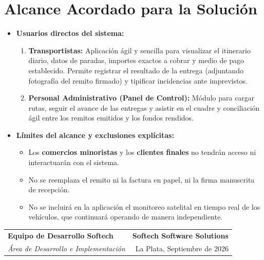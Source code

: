 \documentclass[11pt,a4paper]{article}
\begin{document}
\section{Alcance Acordado para la Solución}

\begin{itemize}
  \item \textbf{Usuarios directos del sistema:}
  \begin{enumerate}
    \item \textbf{Transportistas:} Aplicación ágil y sencilla para visualizar el itinerario diario, datos de paradas, importes exactos a cobrar y medio de pago establecido. Permite registrar el resultado de la entrega (adjuntando fotografía del remito firmado) y tipificar incidencias ante imprevistos.
    \item \textbf{Personal Administrativo (Panel de Control):} Módulo para cargar rutas, seguir el avance de las entregas y asistir en el cuadre y conciliación ágil entre los remitos emitidos y los fondos rendidos.
  \end{enumerate}
  \item \textbf{Límites del alcance y exclusiones explícitas:}
  \begin{itemize}
    \item Los \textbf{comercios minoristas} y los \textbf{clientes finales} no tendrán acceso ni interactuarán con el sistema.
    \item No se reemplaza el remito ni la factura en papel, ni la firma manuscrita de recepción.
    \item No se incluirá en la aplicación el monitoreo satelital en tiempo real de los vehículos, que continuará operando de manera independiente.
  \end{itemize}
\end{itemize}
\vspace{10pt}

\noindent
{}

\vfill

\noindent
\begin{tabularx}{\textwidth}{@{}X r@{}}
  \textbf{Equipo de Desarrollo Softech} & \textbf{Softech Software Solutions} \\
  \textit{Área de Desarrollo e Implementación} & La Plata, Septiembre de 2026 \\
\end{tabularx}
\end{document}
